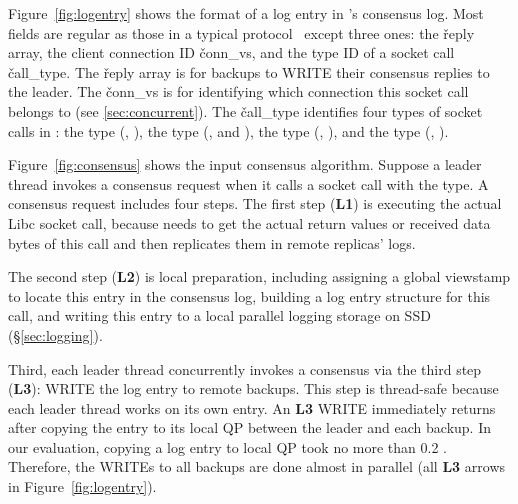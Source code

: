 Figure~\ref{fig:logentry} shows the format of a log entry in \xxx's consensus 
log. Most fields are regular as those in a typical \paxos 
protocol~\cite{paxos:practical} except three ones: the \v{reply} array, the 
client connection ID \v{conn\_vs}, and the type ID of a socket call 
\v{call\_type}. The \v{reply} array is for backups to WRITE their consensus 
replies to the leader. The \v{conn\_vs} is for identifying which connection this 
socket call belongs to (see \ref{sec:concurrent}). The \v{call\_type} 
identifies four types of socket calls in \xxx: the \accept type (\eg, \accept), 
the \recv type (\eg, \recv and \myread), the \send type (\eg, \send), and the 
\close type (\eg, \close).

Figure~\ref{fig:consensus} shows the input consensus algorithm. Suppose a 
leader thread invokes a consensus request when it calls a socket call with the 
\recv type. A consensus request includes four steps. The first step 
(\textbf{L1}) is executing the actual Libc socket call, because \xxx needs to 
get the actual return values or received data bytes of this call and then 
replicates them in remote replicas' logs.

The second step (\textbf{L2}) is local preparation, including assigning a 
global viewstamp to locate this entry in the consensus log, building a log 
entry structure for this call, and writing this entry to a local parallel 
logging storage on SSD (\S\ref{sec:logging}). 

Third, each leader thread concurrently invokes a consensus via the third step 
(\textbf{L3}): WRITE the log entry to remote backups. This step is thread-safe 
because each leader thread works on its own entry. An \textbf{L3} WRITE 
immediately returns after copying the entry to its local QP between the leader 
and each backup. In our evaluation, copying a log entry to local QP took 
no more than 0.2 \us. Therefore, the WRITEs to all backups are done almost in 
parallel (all \textbf{L3} arrows in Figure~\ref{fig:logentry}).



